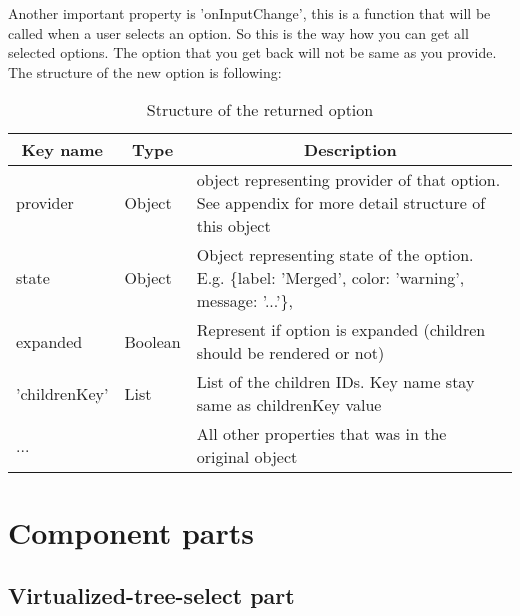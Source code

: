 Another important property is 'onInputChange', this is a function that will be called when a user selects an option. So this is the way how you can get all selected options. The option that you get back will not be same as you provide. The structure of the new option is following:
\begin{center}
    \begin{longtable}{ | l | l | p{10cm} | }
    \caption{Structure of the returned option} \label{tab:perf} \\
    \hline 
    \multicolumn{1}{|c|}{\textbf{Key name}} & 
    \multicolumn{1}{c|}{\textbf{Type}} & 
    \multicolumn{1}{c|}{\textbf{Description}} \\ \hline 
	\endfirsthead
    \hline 

	provider & Object & object representing provider of that option. See appendix for more detail structure of this object \\ \hline
    state & Object & Object representing state of the option. E.g. \{label: 'Merged', color: 'warning', message: '...'\}, \\ \hline
    expanded & Boolean & Represent if option is expanded (children should be rendered or not)\\ \hline					
    'childrenKey' & List & List of the children IDs. Key name stay same as childrenKey value\\ \hline
    ... &  &  All other properties that was in the original object\\ \hline
    

    \end{longtable}
\end{center}
 


\section{Component parts}

 \subsection{Virtualized-tree-select part}

